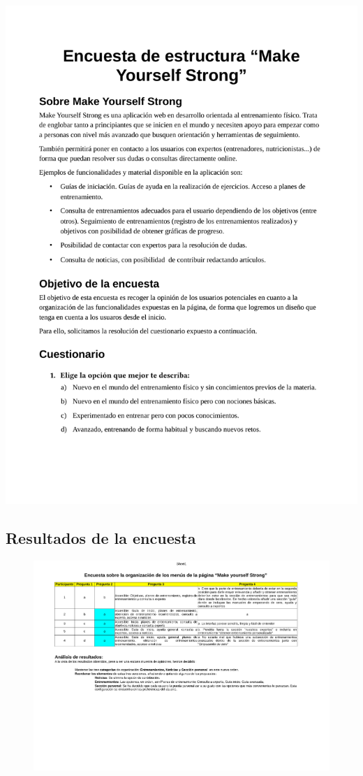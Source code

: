 \documentclass[a4paper]{article}
\begin{document}
 \includegraphics[width=\textwidth, page=3]{./figuras/encuesta.pdf}
 
 \subsection{Resultados de la encuesta}

\begin{figure}[!h]
\centering
 \includegraphics[angle=90,height=0.95\textheight,clip=true,trim=1cm 7cm 2cm 1cm]{./figuras/resultado-encuesta.pdf}
 \end{figure}
 
 
\end{document}
